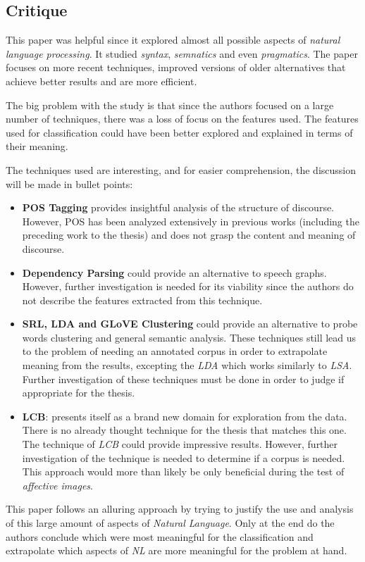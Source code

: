 \documentclass{Paper_Summary}
\begin{document}
\makepapertitle

\breakline

\begin{center}
    \section*{Critique}
\end{center}

    This paper was helpful since it explored almost all possible aspects of \emph{natural language processing}. It studied \emph{syntax}, \emph{semnatics} and even \emph{pragmatics}. The paper focuses on more recent techniques, improved versions of older alternatives that achieve better results and are more efficient.

    The big problem with the study is that since the authors focused on a large number of techniques, there was a loss of focus on the features used. The features used for classification could have been better explored and explained in terms of their meaning.

    The techniques used are interesting, and for easier comprehension, the discussion will be made in bullet points:
    \begin{itemize}
        \item \textbf{POS Tagging} provides insightful analysis of the structure of discourse. However, POS has been analyzed extensively in previous works (including the preceding work to the thesis) and does not grasp the content and meaning of discourse.
        \item \textbf{Dependency Parsing} could provide an alternative to speech graphs. However, further investigation is needed for its viability since the authors do not describe the features extracted from this technique.
        \item \textbf{SRL, LDA and GLoVE Clustering} could provide an alternative to probe words clustering and general semantic analysis. These techniques still lead us to the problem of needing an annotated corpus in order to extrapolate meaning from the results, excepting the \emph{LDA} which works similarly to \emph{LSA}. Further investigation of these techniques must be done in order to judge if appropriate for the thesis.
        \item \textbf{LCB}: presents itself as a brand new domain for exploration from the data. There is no already thought technique for the thesis that matches this one. The technique of \emph{LCB} could provide impressive results. However, further investigation of the technique is needed to determine if a corpus is needed. This approach would more than likely be only beneficial during the test of \emph{affective images}.
    \end{itemize}

    This paper follows an alluring approach by trying to justify the use and analysis of this large amount of aspects of \emph{Natural Language}. Only at the end do the authors conclude which were most meaningful for the classification and extrapolate which aspects of \emph{NL} are more meaningful for the problem at hand.

\breakline
\end{document}
